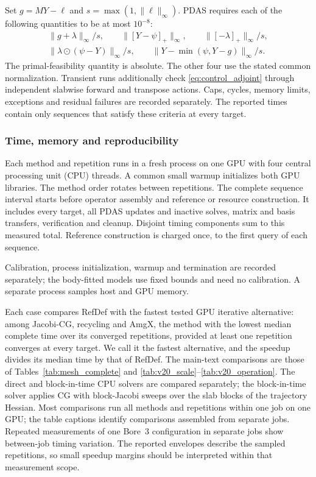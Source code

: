 Set $g=MY-\ell$ and $s=\max(1,\|\ell\|_\infty)$.
PDAS requires each of the following quantities to be at most
$10^{-8}$:
\begin{equation}\label{eq:cht_kkt_acceptance}
\begin{gathered}
 \|g+\lambda\|_\infty/s,\qquad
 \|[Y-\psi]_+\|_\infty,\qquad
 \|[-\lambda]_+\|_\infty/s,\\
 \|\lambda\odot(\psi-Y)\|_\infty/s,\qquad
 \|Y-\min(\psi,Y-g)\|_\infty/s.
\end{gathered}
\end{equation}
The primal-feasibility quantity is absolute. The other four use
the stated common normalization. Transient runs additionally
check \eqref{eq:control_adjoint} through independent slabwise
forward and transpose actions. Caps, cycles, memory limits,
exceptions and residual failures are recorded separately. The reported
times contain only sequences that satisfy these criteria at every target.

\subsubsection{Time, memory and reproducibility}
Each method and repetition runs in a fresh process on one GPU
with four central processing unit (CPU) threads. A common small warmup initializes both
GPU libraries. The method order rotates between repetitions.
The complete sequence interval starts before operator assembly
and reference or resource construction. It includes every target,
all PDAS updates and inactive solves, matrix and basis transfers,
verification and cleanup. Disjoint timing components sum to this
measured total. Reference construction is charged once, to the first
query of each sequence.

Calibration, process initialization, warmup and termination are recorded
separately; the body-fitted models use fixed bounds and need no calibration. A
separate process samples host and GPU memory.

Each case compares RefDef with the fastest tested GPU iterative
alternative: among Jacobi-CG, recycling and AmgX, the method with the lowest
median complete time over its converged repetitions, provided at least one
repetition converges at every target. We call it the fastest alternative, and the
speedup divides its median time by that of RefDef. The main-text
comparisons are those of Tables~\ref{tab:mesh_complete} and
\ref{tab:v20_scale}--\ref{tab:v20_operation}. The direct and block-in-time CPU
solvers are compared separately; the block-in-time solver applies CG with block-Jacobi
sweeps over the slab blocks of the trajectory Hessian. Most comparisons run all methods
and repetitions within one job on one GPU; the table captions identify comparisons
assembled from separate jobs. Repeated measurements of one Bore~3 configuration in
separate jobs show between-job timing variation. The reported envelopes describe the
sampled repetitions, so small speedup margins should be interpreted within that
measurement scope.

